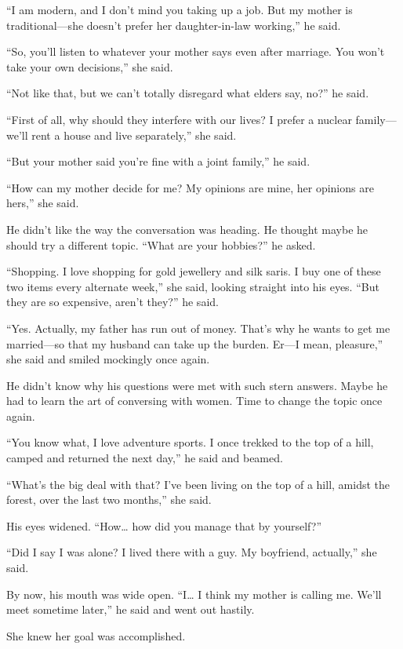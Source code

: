 “I am modern, and I don't mind you taking up a job. But my mother is
traditional—she doesn't prefer her daughter-in-law working,” he said.

“So, you'll listen to whatever your mother says even after marriage. You won't
take your own decisions,” she said.

“Not like that, but we can't totally disregard what elders say, no?” he said.

“First of all, why should they interfere with our lives? I prefer a nuclear
family—we'll rent a house and live separately,” she said.

“But your mother said you're fine with a joint family,” he said.

“How can my mother decide for me? My opinions are mine, her opinions are hers,”
she said.

He didn't like the way the conversation was heading. He thought maybe he should
try a different topic. “What are your hobbies?” he asked.

“Shopping. I love shopping for gold jewellery and silk saris. I buy one of these
two items every alternate week,” she said, looking straight into his eyes.
“But they are so expensive, aren't they?” he said.

“Yes. Actually, my father has run out of money. That's why he wants to get me
married—so that my husband can take up the burden. Er—I mean, pleasure,” she
said and smiled mockingly once again.

He didn't know why his questions were met with such stern answers. Maybe he had
to learn the art of conversing with women. Time to change the topic once
again.

“You know what, I love adventure sports. I once trekked to the top of a hill,
camped and returned the next day,” he said and beamed.

“What's the big deal with that? I've been living on the top of a hill, amidst
the forest, over the last two months,” she said.

His eyes widened. “How… how did you manage that by yourself?”

“Did I say I was alone? I lived there with a guy. My boyfriend, actually,” she
said.

By now, his mouth was wide open. “I… I think my mother is calling me. We'll
meet sometime later,” he said and went out hastily.

She knew her goal was accomplished.
